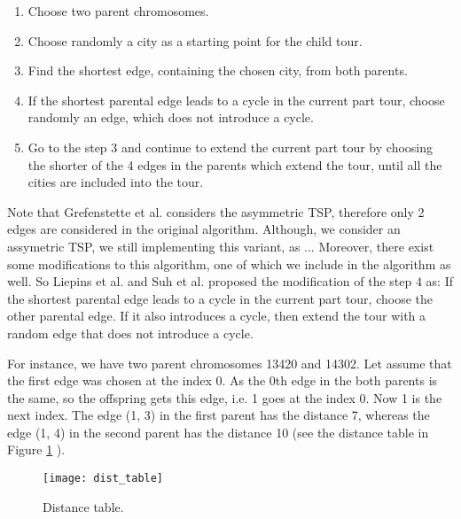 \documentclass[a4paper, 12pt, headings=standardclasses]{scrartcl}
\begin{document}
\begin{enumerate}
	\item Choose two parent chromosomes.
	\item Choose randomly a city as a starting point for the child tour.
	\item Find the shortest edge, containing the chosen city, from both parents.
	\item If the shortest parental edge leads to a cycle in the current part tour,
	 choose randomly an edge, which does not introduce a cycle.
	 \item Go to the step $3$ and continue to extend the current part tour by choosing the shorter of the 4 edges in the parents which extend the tour, until all the cities are included into the tour.	 
\end{enumerate}

Note that Grefenstette et al. considers the asymmetric TSP, therefore only 2 edges are considered in the original algorithm. Although, we consider an assymetric TSP, we still implementing this variant, as ...  Moreover, there exist some modifications to this algorithm, one of which we include in the algorithm as well. So Liepins et al. \cite{liepins1987greedy} and Suh et al. \cite{suh1987incorporating} proposed the modification of the step $4$ as:
If the shortest parental edge leads to a cycle in the current part tour, choose the other parental edge. If it also introduces a cycle, then extend the tour with a random edge that does not introduce a cycle. 

For instance, we have two parent chromosomes 13420 and 14302. Let assume that the first edge was chosen at the index 0. As the 0th edge in the both parents is the same, so the offspring gets this edge, i.e. 1 goes at the index 0. Now 1 is the next index. The edge (1, 3) in the first parent has the distance 7, whereas the edge (1, 4) in the second parent has the distance 10 (see the distance table in Figure \ref{dist_table} ). 
 \begin{figure}[!ht]
	\centering
	\texttt{[image: dist\_table]}
	\caption{Distance table.}
	\label{dist_table}
\end{figure}
\end{document}
